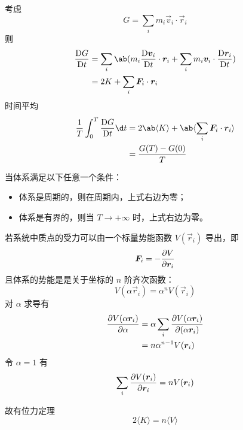 考虑
\begin{equation}
    G = \sum_i m_i \vec{v}_i \cdot \vec{r}_i
\end{equation}
则
\begin{equation}\begin{aligned}
    \mdv{G}{t} &= \sum_i \ab( m_i \mdv{\vec{v}_i}{t} \cdot \vec{r}_i
    + \sum_i m_i \vec{v}_i \cdot \mdv{\vec{r}_i}{t} ) \\
    &= 2 K + \sum_i \vec{F}_i \cdot \vec{r}_i
\end{aligned}\end{equation}
时间平均
\begin{equation}\begin{aligned}
    \frac{1}{T} \int_0^T \mdv{G}{t} \d t
    &= 2 \ab\langle K \rangle + \ab\langle \sum_i \vec{F}_i \cdot \vec{r}_i \rangle \\
    &= \frac{G(T) - G(0)}{T}
\end{aligned}\end{equation}

当体系满足以下任意一个条件：
\begin{itemize}
    \item 体系是周期的，则在周期内，上式右边为零；
    \item 体系是有界的，则当 $T \to + \infty$ 时，上式右边为零。
\end{itemize}

若系统中质点的受力可以由一个标量势能函数 $V({\vec{r}_i})$ 导出，即
\begin{equation}
    \bm{F}_i = - \pdv{V}{\bm{r}_i}
\end{equation}
且体系的势能是是关于坐标的 $n$ 阶齐次函数：
\begin{equation}
    V({\alpha \vec{r}_i}) = \alpha^n V({\vec{r}_i})
\end{equation}
对 $\alpha$ 求导有
\begin{equation}\begin{aligned}
\pdv{V({\alpha \bm{r}_i})}{\alpha} &= \alpha \sum_i \pdv{V({\alpha \bm{r}_i})}{(\alpha \bm{r}_i)} \\
&= n \alpha^{n-1} V({\bm{r}_i})
\end{aligned}\end{equation}
令 $\alpha = 1$ 有
\begin{equation}
    \sum_i \pdv{V({\bm{r}_i})}{\bm{r}_i} = n V({\bm{r}_i})
\end{equation}

故有位力定理
\begin{equation}
    2 \langle K \rangle = n \langle V \rangle
\end{equation}

